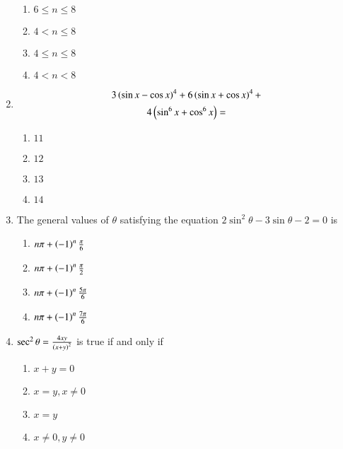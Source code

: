 \begin{enumerate}[label=\thesubsection.\arabic*,ref=\thesubsection.\theenumi]
        \hfill{}
        \begin{enumerate}
                \item $6\le n\le8$
                \item $4<n\le8$
                \item $4\le n\le8$  
                \item $4<n<8$
        \end{enumerate}


	\item \begin{multline*}
		3\left(\sin{x} - \cos{x}\right)^4 + 6\left(\sin{x} + \cos{x}\right)^4 + \\ 4\left(\sin^6{x}+\cos^6{x}\right) =
	\end{multline*}
        
        \hfill{}
        \begin{enumerate}
                \item $11$
                \item $12$
                \item $13$
                \item $14$
        \end{enumerate}   

    \item The general values of $\theta$ satisfying the equation $2\sin^2{\theta}-3\sin{\theta}-2=0$ is
        
        \hfill{}
        \begin{enumerate}
                \item $n\pi + \left(-1\right)^n\frac{\pi}{6}$
                \item $n\pi + \left(-1\right)^n\frac{\pi}{2}$
                \item $n\pi + \left(-1\right)^n\frac{5\pi}{6}$ 
                \item $n\pi + \left(-1\right)^n\frac{7\pi}{6}$
        \end{enumerate}

    \item $\sec^2{\theta} = \frac{4xy}{\left(x+y\right)^2}$ is true if and only if
        
        \hfill{}
        \begin{enumerate}
                \item $x+y=0$
                \item $x=y,x\neq0$
                \item $x=y$ 
                \item $x\neq0,y\neq0$
        \end{enumerate}
        

\end{enumerate}
